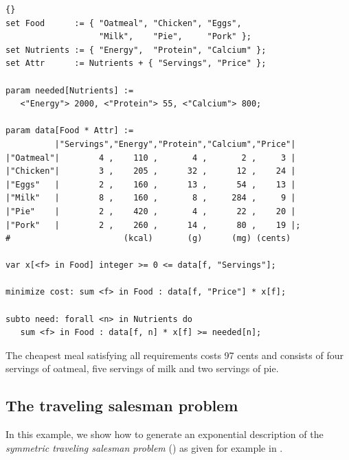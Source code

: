 \medskip
{}
\begin{lstlisting}[frame=tb]{}
set Food      := { "Oatmeal", "Chicken", "Eggs",
                   "Milk",    "Pie",     "Pork" };
set Nutrients := { "Energy",  "Protein", "Calcium" };
set Attr      := Nutrients + { "Servings", "Price" };

param needed[Nutrients] :=
   <"Energy"> 2000, <"Protein"> 55, <"Calcium"> 800;

param data[Food * Attr] :=
          |"Servings","Energy","Protein","Calcium","Price"|
|"Oatmeal"|        4 ,    110 ,       4 ,       2 ,     3 |
|"Chicken"|        3 ,    205 ,      32 ,      12 ,    24 |
|"Eggs"   |        2 ,    160 ,      13 ,      54 ,    13 |
|"Milk"   |        8 ,    160 ,       8 ,     284 ,     9 |
|"Pie"    |        2 ,    420 ,       4 ,      22 ,    20 |
|"Pork"   |        2 ,    260 ,      14 ,      80 ,    19 |;
#                       (kcal)       (g)      (mg) (cents)

var x[<f> in Food] integer >= 0 <= data[f, "Servings"];

minimize cost: sum <f> in Food : data[f, "Price"] * x[f];

subto need: forall <n> in Nutrients do
   sum <f> in Food : data[f, n] * x[f] >= needed[n];
\end{lstlisting}

\medskip
\noindent The cheapest meal satisfying all requirements costs 97 cents and
consists of four servings of oatmeal, five servings of milk and two
servings of pie.


\subsection{The traveling salesman problem}
In this example, we show how to generate an exponential
description of the \emph{symmetric traveling salesman problem} (\tsp)
as given for example in
\cite[Section 58.5]{Schrijver2003}.

